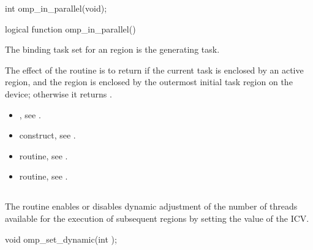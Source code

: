 \format
\begin{ccppspecific}
\begin{ompcFunction}
int omp_in_parallel(void);
\end{ompcFunction}
\end{ccppspecific}

\begin{fortranspecific}
\begin{ompfFunction}
logical function omp_in_parallel()
\end{ompfFunction}
\end{fortranspecific}

\binding
The binding task set for an  region is the generating task.

\effect
The effect of the  routine is to return 
 if the current task is enclosed by an active  
region, and the  region is enclosed by the outermost 
initial task region on the device; otherwise it returns .

\crossreferences
\begin{itemize}
\item {}, see
.

\item {} construct, see
.

\item {} routine, see
.

\item {} routine, see
.
\end{itemize}



\subsection{}
\label{subsec:omp_set_dynamic}
\summary
The  routine enables or disables dynamic 
adjustment of the number of threads available for the execution 
of subsequent  regions by setting the value of 
the  ICV.

\format
\begin{ccppspecific}
\begin{ompcFunction}
void omp_set_dynamic(int );
\end{ompcFunction}
\end{ccppspecific}
\bigskip


